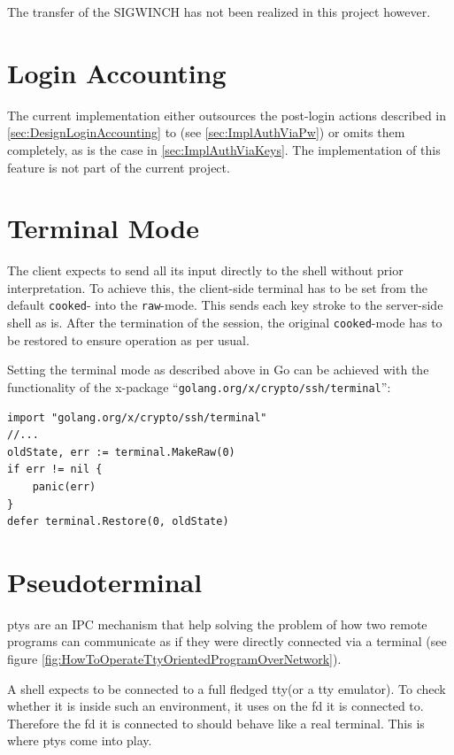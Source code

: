 \documentclass[10pt,a4paper,titlepage,twoside,english,final]{zhawreprt}
\begin{document}
The transfer of the \gls{SIGWINCH} has not been realized in this project however.


\section{Login Accounting}\label{sec:ImplLoginAccounting}
The current implementation either outsources the post-\gls{login} actions described in \ref{sec:DesignLoginAccounting} to \cite{login}(see \ref{sec:ImplAuthViaPw}) or omits them completely, as is the case in \ref{sec:ImplAuthViaKeys}.
The implementation of this feature is not part of the current project.

\section{Terminal Mode}\label{sec:ImplTerminalMode}
The client expects to send all its input directly to the \gls{shell} without prior interpretation.
To achieve this, the client-side \gls{terminal} has to be set from the default \texttt{cooked}- into the \texttt{raw}-mode\citep[p.1309]{KerriskTLPI}.
This sends each key stroke to the server-side \gls{shell} as is.
After the termination of the session, the original \texttt{cooked}-mode has to be restored to ensure operation as per usual.

Setting the \gls{terminal} mode as described above in \gls{Go} can be achieved with the functionality of the x-package ``\texttt{golang.org/x/crypto/ssh/terminal}'':
\setlistingGo
\begin{lstlisting}[caption={Setting the \gls{terminal} mode in \gls{Go}},label=lst:GoTermMode]
import "golang.org/x/crypto/ssh/terminal"
//...
oldState, err := terminal.MakeRaw(0)
if err != nil {
	panic(err)
}
defer terminal.Restore(0, oldState)
\end{lstlisting}

\section{Pseudoterminal}\label{sec:ImplPseudoterminal}
\glspl{pty} are an \gls{IPC} mechanism that help solving the problem of how two remote programs can communicate as if they were directly connected via a \gls{terminal} (see figure \ref{fig:HowToOperateTtyOrientedProgramOverNetwork}).

A \gls{shell} expects to be connected to a full fledged \gls{tty}(or a \gls{tty} emulator).
To check whether it is inside such an environment, it uses \cite{isatty} on the \gls{fd} it is connected to.
Therefore the \gls{fd} it is connected to should behave like a real \gls{terminal}.
This is where \glspl{pty} come into play.
\end{document}
